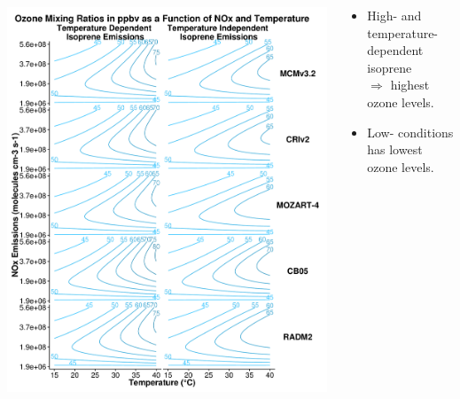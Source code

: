 \documentclass[center]{beamer}
\begin{document}
{
    \begin{frame}[plain]
        \vspace{-5mm}
        \begin{columns}[onlypaperwidth]
            \begin{column}{0.75\textwidth}
                \begin{center}
                    \includegraphics[height = 0.98\paperheight, width = \textwidth]{../Plotting/O3_comparison} 
                \end{center}
            \end{column}%
            \begin{column}{0.43\textwidth} 
                \begin{flushleft}
                    \small{
                        \begin{itemize} 
                            \item High- and temperature-dependent isoprene \\ $\Rightarrow$ highest ozone levels. \vspace{3mm}
                            \item Low- conditions has lowest ozone levels. \vspace{3mm}

\end{itemize}}
\end{flushleft}
\end{column}
\end{columns}
\end{frame}}
\end{document}
